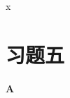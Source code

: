 \begin{solution}
    
\end{solution}





\begin{example}
    
\end{example}

\begin{solution}
    
\end{solution}
x



\begin{example}
    
\end{example}

\begin{solution}
    
\end{solution}











\begin{example}
    
\end{example}

\begin{solution}
    
\end{solution}











\begin{example}
    
\end{example}

\begin{solution}
    
\end{solution}








\section*{习题五}
\begin{center}
    \bfseries A
\end{center}

